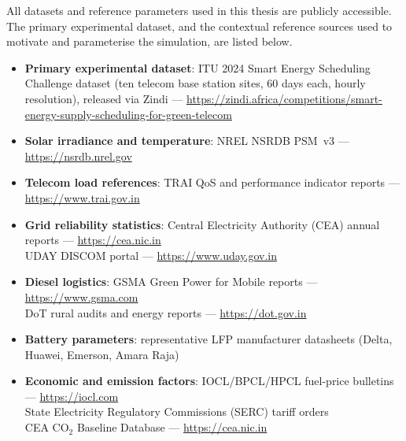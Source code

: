 
\label{app:data-sources}

All datasets and reference parameters used in this thesis are publicly
accessible. The primary experimental dataset, and the contextual
reference sources used to motivate and parameterise the simulation, are
listed below.

\begin{itemize}[leftmargin=*]
    \item \textbf{Primary experimental dataset}:
    ITU 2024 Smart Energy Scheduling Challenge dataset (ten telecom base
    station sites, 60 days each, hourly resolution), released via Zindi
    \citep{itu2024zindi} —
    \url{https://zindi.africa/competitions/smart-energy-supply-scheduling-for-green-telecom}

    \item \textbf{Solar irradiance and temperature}:  
    NREL NSRDB PSM~v3 — \url{https://nsrdb.nrel.gov}

    \item \textbf{Telecom load references}:  
    TRAI QoS and performance indicator reports — \url{https://www.trai.gov.in}

    \item \textbf{Grid reliability statistics}:  
    Central Electricity Authority (CEA) annual reports — \url{https://cea.nic.in} \\
    UDAY DISCOM portal — \url{https://www.uday.gov.in}

    \item \textbf{Diesel logistics}:  
    GSMA Green Power for Mobile reports — \url{https://www.gsma.com} \\
    DoT rural audits and energy reports — \url{https://dot.gov.in}

    \item \textbf{Battery parameters}:  
    representative LFP manufacturer datasheets (Delta, Huawei, Emerson, Amara Raja)

    \item \textbf{Economic and emission factors}:  
    IOCL/BPCL/HPCL fuel-price bulletins — \url{https://iocl.com} \\
    State Electricity Regulatory Commissions (SERC) tariff orders \\
    CEA CO$_2$ Baseline Database — \url{https://cea.nic.in}
\end{itemize}